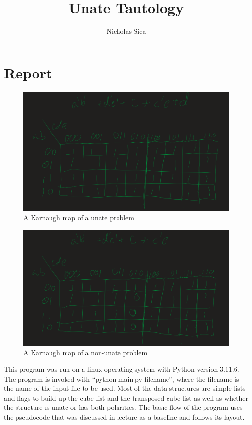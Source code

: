 \documentclass[journal,onecolumn,12pt]{IEEEtran}
\title{Unate Tautology}
\author{Nicholas Sica}
\begin{document}
\maketitle

\section{Report}
\begin{figure}
  \centering
  \includegraphics[width=0.95\columnwidth]{kmap_unate.png}
  \caption{A Karnaugh map of a unate problem}\label{fig:kmap_unate}
\end{figure}

\begin{figure}
  \centering
  \includegraphics[width=0.95\columnwidth]{kmap_non_unate.png}
  \caption{A Karnaugh map of a non-unate problem}\label{fig:kmap_non_unate}
\end{figure}

This program was run on a linux operating system with Python
version 3.11.6. The program is invoked with ``python main.py
filename'', where the filename is the name of the input file to be
used. Most of the data structures are simple lists and flags to build up the cube list and the transposed cube list as well as whether the
structure is unate or has both polarities. The basic flow of the
program uses the pseudocode that was discussed in lecture as a
baseline and follows its layout.
\end{document}
